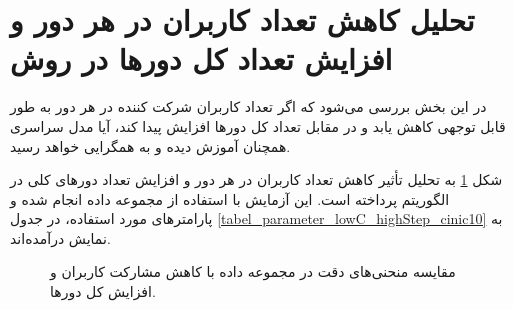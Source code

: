 \section{
	تحلیل کاهش تعداد کاربران در هر دور و افزایش تعداد کل دورها در روش
}
در این بخش بررسی می‌شود که اگر تعداد کاربران شرکت کننده در هر دور به طور قابل توجهی کاهش یابد و در مقابل تعداد کل دورها افزایش پیدا کند، آیا مدل سراسری همچنان آموزش دیده و به همگرایی خواهد رسید.

شکل
\ref{result_lowC_highStep_cinic10}
به تحلیل تأثیر کاهش تعداد کاربران در هر دور و افزایش تعداد دورهای کلی در الگوریتم
پرداخته است. این آزمایش با استفاده از مجموعه داده
انجام شده و پارامترهای مورد استفاده، در جدول
\ref{tabel_parameter_lowC_highStep_cinic10}
به نمایش درآمده‌اند.

\begin{figure}[h]
	\centering
	\hspace{0.8mm}
	\caption{
		مقایسه منحنی‌های دقت در مجموعه داده
		با کاهش مشارکت کاربران و افزایش  کل دورها.
	}
	\label{result_lowC_highStep_cinic10}
\end{figure}


